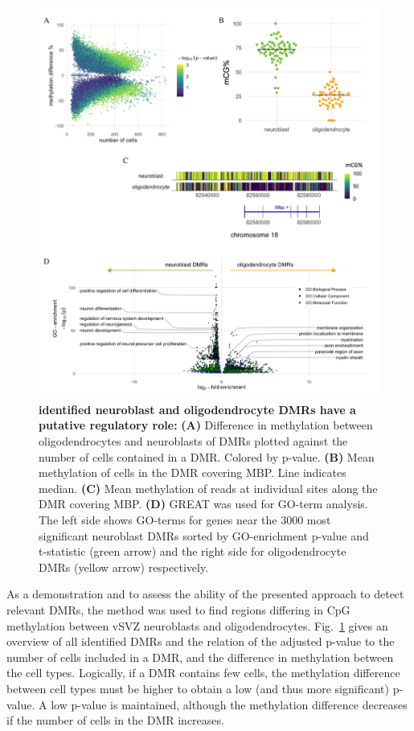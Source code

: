 \documentclass[twocolumn,10pt]{article}
\begin{document}
\begin{figure}[t]
    \begin{center}
        \includegraphics[width=.8\textwidth]{figures/Fig_DMRs.png}
    \end{center}
    \caption{\small \textbf{identified neuroblast and oligodendrocyte DMRs have a putative regulatory role:} \textbf{(A)} Difference in methylation between oligodendrocytes and neuroblasts of DMRs plotted against the number of cells contained in a DMR.
Colored by p-value.
\textbf{(B)} Mean methylation of cells in the DMR covering MBP.
Line indicates median.
\textbf{(C)} Mean methylation of reads at individual sites along the DMR covering MBP.
\textbf{(D)} GREAT \citet{mclean2010great} was used for GO-term analysis.
The left side shows GO-terms for genes near the 3000 most significant neuroblast DMRs sorted by GO-enrichment p-value and t-statistic (green arrow) and the right side for oligodendrocyte DMRs (yellow arrow) respectively.
    }
    \label{fig:dmr}
\end{figure}

As a demonstration and to assess the ability of the presented approach to detect relevant DMRs, the method was used to find regions differing in CpG methylation between vSVZ neuroblasts and oligodendrocytes.
Fig.~\ref{fig:dmr} gives an overview of all identified DMRs and the relation of the adjusted p-value to the number of cells included in a DMR, and the difference in methylation between the cell types.
Logically, if a DMR contains few cells, the methylation difference between cell types must be higher to obtain a low (and thus more significant) p-value.
A low p-value is maintained, although the methylation difference decreases if the number of cells in the DMR increases.
\end{document}
